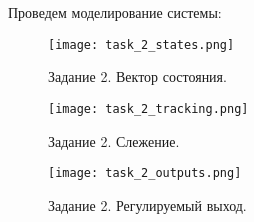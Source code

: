 Проведем моделирование системы:

\begin{figure}[h]
    \centering
    \texttt{[image: task\_2\_states.png]}
    \caption{\label{fig:task4_3_2}Задание 2. Вектор состояния.}
\end{figure}

\begin{figure}[]
    \centering
    \texttt{[image: task\_2\_tracking.png]}
    \caption{\label{fig:task4_3_2}Задание 2. Слежение.}
\end{figure}

\begin{figure}[]
    \centering
    \texttt{[image: task\_2\_outputs.png]}
    \caption{\label{fig:task4_3_2}Задание 2. Регулируемый выход.}
\end{figure}
\pagebreak